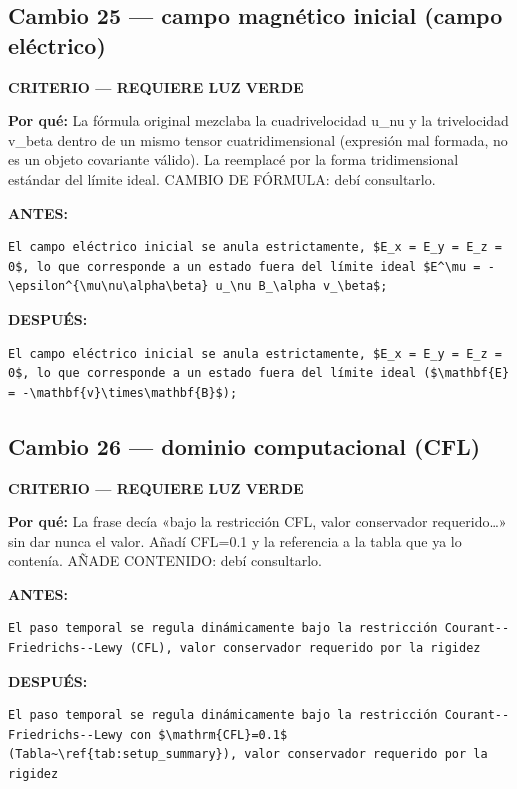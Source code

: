 \documentclass[11pt,a4paper]{article}
\begin{document}
\subsection*{Cambio 25 --- campo magnético inicial (campo eléctrico)}
\colorbox{critbg}{\textbf{\footnotesize CRITERIO --- REQUIERE LUZ VERDE}}

\textbf{Por qué:} La fórmula original mezclaba la cuadrivelocidad u\_nu y la trivelocidad v\_beta dentro de un mismo tensor cuatridimensional (expresión mal formada, no es un objeto covariante válido). La reemplacé por la forma tridimensional estándar del límite ideal. CAMBIO DE FÓRMULA: debí consultarlo.

\textcolor{antesline}{\textbf{ANTES:}}
\begin{Verbatim}[breaklines=true, breakanywhere=true, fontsize=\small, frame=leftline, rulecolor=\color{antesline}, framerule=1.2pt]
El campo eléctrico inicial se anula estrictamente, $E_x = E_y = E_z = 0$, lo que corresponde a un estado fuera del límite ideal $E^\mu = -\epsilon^{\mu\nu\alpha\beta} u_\nu B_\alpha v_\beta$;
\end{Verbatim}
\textcolor{despline}{\textbf{DESPUÉS:}}
\begin{Verbatim}[breaklines=true, breakanywhere=true, fontsize=\small, frame=leftline, rulecolor=\color{despline}, framerule=1.2pt]
El campo eléctrico inicial se anula estrictamente, $E_x = E_y = E_z = 0$, lo que corresponde a un estado fuera del límite ideal ($\mathbf{E} = -\mathbf{v}\times\mathbf{B}$);
\end{Verbatim}

\subsection*{Cambio 26 --- dominio computacional (CFL)}
\colorbox{critbg}{\textbf{\footnotesize CRITERIO --- REQUIERE LUZ VERDE}}

\textbf{Por qué:} La frase decía «bajo la restricción CFL, valor conservador requerido…» sin dar nunca el valor. Añadí CFL=0.1 y la referencia a la tabla que ya lo contenía. AÑADE CONTENIDO: debí consultarlo.

\textcolor{antesline}{\textbf{ANTES:}}
\begin{Verbatim}[breaklines=true, breakanywhere=true, fontsize=\small, frame=leftline, rulecolor=\color{antesline}, framerule=1.2pt]
El paso temporal se regula dinámicamente bajo la restricción Courant--Friedrichs--Lewy (CFL), valor conservador requerido por la rigidez
\end{Verbatim}
\textcolor{despline}{\textbf{DESPUÉS:}}
\begin{Verbatim}[breaklines=true, breakanywhere=true, fontsize=\small, frame=leftline, rulecolor=\color{despline}, framerule=1.2pt]
El paso temporal se regula dinámicamente bajo la restricción Courant--Friedrichs--Lewy con $\mathrm{CFL}=0.1$ (Tabla~\ref{tab:setup_summary}), valor conservador requerido por la rigidez
\end{Verbatim}
\end{document}
